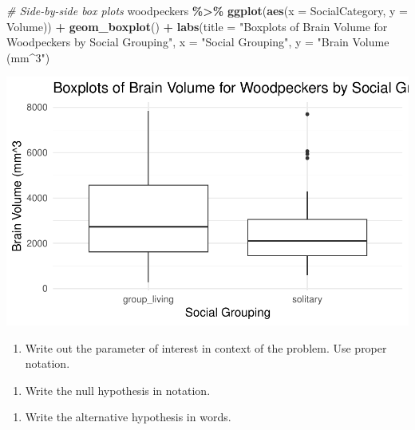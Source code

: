 \documentclass[
]{report}
\newenvironment{Shaded}{\begin{snugshade}}{\end{snugshade}}
\newcommand{\AttributeTok}[1]{\textcolor[rgb]{0.13,0.29,0.53}{#1}}
\newcommand{\CommentTok}[1]{\textcolor[rgb]{0.56,0.35,0.01}{\textit{#1}}}
\newcommand{\FunctionTok}[1]{\textcolor[rgb]{0.13,0.29,0.53}{\textbf{#1}}}
\newcommand{\NormalTok}[1]{#1}
\newcommand{\SpecialCharTok}[1]{\textcolor[rgb]{0.81,0.36,0.00}{\textbf{#1}}}
\newcommand{\StringTok}[1]{\textcolor[rgb]{0.31,0.60,0.02}{#1}}
\providecommand{\tightlist}{%
  \setlength{\itemsep}{0pt}\setlength{\parskip}{0pt}}
\begin{document}
\begin{Shaded}
\begin{Highlighting}[]
\CommentTok{\# Side{-}by{-}side box plots}
\NormalTok{woodpeckers }\SpecialCharTok{\%\textgreater{}\%}
\FunctionTok{ggplot}\NormalTok{(}\FunctionTok{aes}\NormalTok{(}\AttributeTok{x =}\NormalTok{ SocialCategory, }\AttributeTok{y =}\NormalTok{ Volume)) }\SpecialCharTok{+}
    \FunctionTok{geom\_boxplot}\NormalTok{() }\SpecialCharTok{+} 
    \FunctionTok{labs}\NormalTok{(}\AttributeTok{title =} \StringTok{"Boxplots of Brain Volume for Woodpeckers by Social Grouping"}\NormalTok{,}
         \AttributeTok{x =} \StringTok{"Social Grouping"}\NormalTok{, }
         \AttributeTok{y =} \StringTok{"Brain Volume (mm\^{}3"}\NormalTok{) }
  
\end{Highlighting}
\end{Shaded}

\begin{center}\includegraphics[width=0.6\linewidth]{14-UR-module12_review_files/figure-latex/unnamed-chunk-2-1} \end{center}

\begin{enumerate}
\def\labelenumi{\arabic{enumi}.}
\tightlist
\item
  Write out the parameter of interest in context of the problem. Use proper notation.
\end{enumerate}

\vspace{0.5in}

\begin{enumerate}
\def\labelenumi{\arabic{enumi}.}
\setcounter{enumi}{1}
\tightlist
\item
  Write the null hypothesis in notation.
\end{enumerate}

\vspace{0.5in}

\begin{enumerate}
\def\labelenumi{\arabic{enumi}.}
\setcounter{enumi}{2}
\tightlist
\item
  Write the alternative hypothesis in words.
\end{enumerate}
\end{document}
